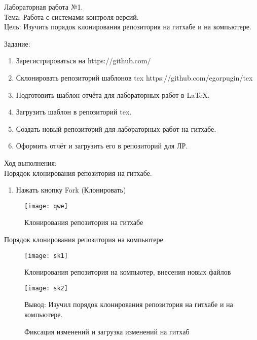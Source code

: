 \begin{center}
Лабораторная работа №1.
\\
Тема: Работа с системами контроля версий.
\\
Цель: Изучить порядок клонирования репозитория на гитхабе и на компьютере.
 
\end{center}
Задание:
\begin{enumerate}
\item Зарегистрироваться на https://github.com/

\item Склонировать репозиторий шаблонов tex https://github.com/egorpugin/tex
 
\item Подготовить шаблон отчёта для лабораторных работ в LaTeX.

\item Загрузить шаблон в репозиторий tex.

\item Создать новый репозиторий для лабораторных работ на гитхабе.

\item Оформить отчёт и загрузить его в репозиторий для ЛР.
\end{enumerate}
Ход выполнения:
\\
Порядок клонирования репозитория на гитхабе.
\\
\begin{enumerate}
\item Нажать кнопку Fork (Клонировать)
\end{enumerate}

\begin{figure}[h]
\centering
\texttt{[image: qwe]}
\caption{Клонирования репозитория на гитхабе}
\label{fig:qwe}
\end{figure}
 
Порядок клонирования репозитория на компьютере.

\begin{figure}[h]
\centering
\texttt{[image: sk1]}
\caption{Клонирования репозитория на компьютер, внесения новых файлов}
\label{fig:sk1}
\end{figure}

\begin{figure}[h]
\centering
\texttt{[image: sk2]}
\caption{Фиксация изменений и загрузка изменений на гитхаб}
\label{fig:sk2}
Вывод: Изучил порядок клонирования репозитория на гитхабе и на компьютере.
\end{figure}




